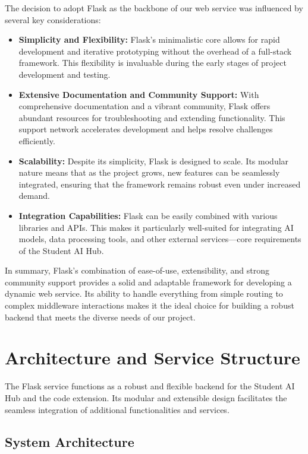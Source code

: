 The decision to adopt Flask as the backbone of our web service was influenced by several key considerations:
\begin{itemize}
    \item \textbf{Simplicity and Flexibility:} Flask’s minimalistic core allows for rapid development and iterative prototyping without the overhead of a full-stack framework. This flexibility is invaluable during the early stages of project development and testing.
    \item \textbf{Extensive Documentation and Community Support:} With comprehensive documentation and a vibrant community, Flask offers abundant resources for troubleshooting and extending functionality. This support network accelerates development and helps resolve challenges efficiently.
    \item \textbf{Scalability:} Despite its simplicity, Flask is designed to scale. Its modular nature means that as the project grows, new features can be seamlessly integrated, ensuring that the framework remains robust even under increased demand.
    \item \textbf{Integration Capabilities:} Flask can be easily combined with various libraries and APIs. This makes it particularly well-suited for integrating AI models, data processing tools, and other external services—core requirements of the Student AI Hub.
\end{itemize}

In summary, Flask’s combination of ease-of-use, extensibility, and strong community support provides a solid and adaptable framework for developing a dynamic web service. Its ability to handle everything from simple routing to complex middleware interactions makes it the ideal choice for building a robust backend that meets the diverse needs of our project.

\section{Architecture and Service Structure}

The Flask service functions as a robust and flexible backend for the Student AI Hub and the code extension. Its modular and extensible design facilitates the seamless integration of additional functionalities and services. 

\subsection{System Architecture}

